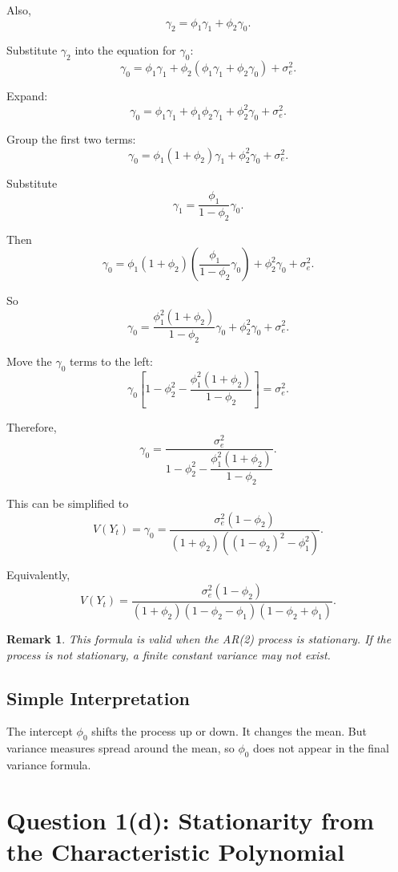 \documentclass[12pt]{article}
\newtheorem*{remark}{Remark}
\begin{document}
Also,
\[
\gamma_2=\phi_1\gamma_1+\phi_2\gamma_0.
\]

Substitute \(\gamma_2\) into the equation for \(\gamma_0\):
\[
\gamma_0
=
\phi_1\gamma_1+\phi_2(\phi_1\gamma_1+\phi_2\gamma_0)+\sigma_e^2.
\]

Expand:
\[
\gamma_0
=
\phi_1\gamma_1+\phi_1\phi_2\gamma_1+\phi_2^2\gamma_0+\sigma_e^2.
\]

Group the first two terms:
\[
\gamma_0
=
\phi_1(1+\phi_2)\gamma_1+\phi_2^2\gamma_0+\sigma_e^2.
\]

Substitute
\[
\gamma_1=\frac{\phi_1}{1-\phi_2}\gamma_0.
\]

Then
\[
\gamma_0
=
\phi_1(1+\phi_2)
\left(\frac{\phi_1}{1-\phi_2}\gamma_0\right)
+\phi_2^2\gamma_0+\sigma_e^2.
\]

So
\[
\gamma_0
=
\frac{\phi_1^2(1+\phi_2)}{1-\phi_2}\gamma_0
+\phi_2^2\gamma_0+\sigma_e^2.
\]

Move the \(\gamma_0\) terms to the left:
\[
\gamma_0
\left[
1-\phi_2^2-\frac{\phi_1^2(1+\phi_2)}{1-\phi_2}
\right]
=
\sigma_e^2.
\]

Therefore,
\[
\gamma_0
=
\frac{\sigma_e^2}{
1-\phi_2^2-\dfrac{\phi_1^2(1+\phi_2)}{1-\phi_2}
}.
\]

This can be simplified to
\[
\boxed{
V(Y_t)
=
\gamma_0
=
\frac{\sigma_e^2(1-\phi_2)}
{(1+\phi_2)\left((1-\phi_2)^2-\phi_1^2\right)}
}.
\]

Equivalently,
\[
\boxed{
V(Y_t)
=
\frac{\sigma_e^2(1-\phi_2)}
{(1+\phi_2)(1-\phi_2-\phi_1)(1-\phi_2+\phi_1)}
}.
\]

\begin{remark}
This formula is valid when the AR(2) process is stationary.  If the process is
not stationary, a finite constant variance may not exist.
\end{remark}

\subsection*{Simple Interpretation}

The intercept \(\phi_0\) shifts the process up or down.  It changes the mean.
But variance measures spread around the mean, so \(\phi_0\) does not appear in
the final variance formula.

\section*{Question 1(d): Stationarity from the Characteristic Polynomial}
\end{document}
